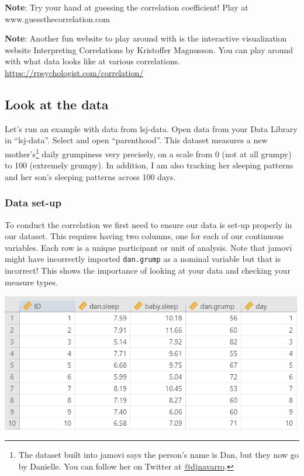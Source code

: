 \documentclass[
]{book}
\begin{document}
\textbf{Note}: Try your hand at guessing the correlation coefficient! Play at www.guessthecorrelation.com

\textbf{Note}: Another fun website to play around with is the interactive visualization website Interpreting Correlations by Kristoffer Magnusson. You can play around with what data looks like at various correlations. \url{https://rpsychologist.com/correlation/}

\hypertarget{look-at-the-data-8}{%
\subsection{Look at the data}\label{look-at-the-data-8}}

Let's run an example with data from lsj-data. Open data from your Data Library in ``lsj-data''. Select and open ``parenthood''. This dataset measures a new mother's\footnote{The dataset built into jamovi says the person's name is Dan, but they now go by Danielle. You can follow her on Twitter at \href{https://twitter.com/djnavarro}{@djnavarro}.} daily grumpiness very precisely, on a scale from 0 (not at all grumpy) to 100 (extremely grumpy). In addition, I am also tracking her sleeping patterns and her son's sleeping patterns across 100 days.

\hypertarget{data-set-up-8}{%
\subsubsection{Data set-up}\label{data-set-up-8}}

To conduct the correlation we first need to ensure our data is set-up properly in our dataset. This requires having two columns, one for each of our continuous variables. Each row is a unique participant or unit of analysis. Note that jamovi might have incorrectly imported \texttt{dan.grump} as a nominal variable but that is incorrect! This shows the importance of looking at your data and checking your measure types.

\includegraphics[width=5.20833in,height=\textheight]{images/08-correlation/correlation-data.png}
\end{document}
